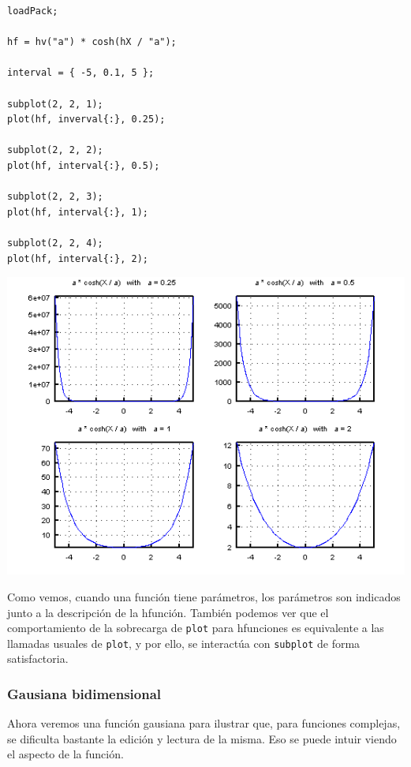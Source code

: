 \documentclass{article}
\begin{document}
\begin{minipage}{0.4\textwidth}
\begin{verbatim}
loadPack;

hf = hv("a") * cosh(hX / "a");

interval = { -5, 0.1, 5 };

subplot(2, 2, 1);
plot(hf, inverval{:}, 0.25);

subplot(2, 2, 2);
plot(hf, interval{:}, 0.5);

subplot(2, 2, 3);
plot(hf, interval{:}, 1);

subplot(2, 2, 4);
plot(hf, interval{:}, 2);
\end{verbatim}
\end{minipage}
\begin{minipage}{0.6\textwidth}
\includegraphics[scale=0.48]{figure2.png}
\end{minipage}

\vspace*{0.5cm}
Como vemos, cuando una función tiene parámetros, los parámetros son
indicados junto a la descripción de la hfunción. También podemos ver
que el comportamiento de la sobrecarga de \texttt{plot} para
hfunciones es equivalente a las llamadas usuales de \texttt{plot}, y
por ello, se interactúa con \texttt{subplot} de forma satisfactoria.

\subsubsection{Gausiana bidimensional}
Ahora veremos una función gausiana para ilustrar que, para funciones
complejas, se dificulta bastante la edición y lectura de la misma. Eso
se puede intuir viendo el aspecto de la función.
\end{document}
